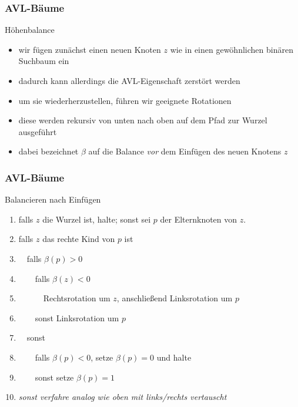 \documentclass[aspectratio=1610, 11pt]{beamer}
\newcommand{\mytitle}{AVL-B\"aume}
\begin{document}
\begin{frame}\frametitle{\mytitle}
	\begin{exampleblock}{H\"ohenbalance}
		\begin{itemize}
			\item wir f\"ugen zun\"achst einen neuen Knoten $z$ wie in einen gew\"ohnlichen bin\"aren Suchbaum ein
			\item dadurch kann allerdings die AVL-Eigenschaft zerst\"ort werden
			\item um sie wiederherzustellen, f\"uhren wir geeignete \alert{Rotationen}
			\item diese werden \alert{rekursiv} von unten nach oben auf dem Pfad zur Wurzel ausgef\"uhrt
			\item dabei bezeichnet $\beta$ auf die Balance {\em vor} dem Einf\"ugen des neuen Knotens $z$
		\end{itemize}
	\end{exampleblock}
\end{frame}

\begin{frame}\frametitle{\mytitle}
	\begin{exampleblock}{Balancieren nach Einf\"ugen}
		\begin{enumerate}
			\item falls $z$ die Wurzel ist, halte; sonst sei $p$ der Elternknoten von $z$.
			\item falls $z$ das rechte Kind von $p$ ist
			\item $\quad$falls $\beta(p)>0$
			\item $\qquad$falls $\beta(z)<0$
			\item $\quad\qquad$Rechtsrotation um $z$, anschlie\ss end Linksrotation um $p$
			\item $\qquad$sonst Linksrotation um $p$
			\item $\quad$sonst
			\item $\qquad$falls $\beta(p)<0$, setze $\beta(p)=0$ und halte
			\item $\qquad$sonst setze $\beta(p)=1$
			\item \itshape sonst verfahre analog wie oben mit links/rechts vertauscht
		\end{enumerate}
	\end{exampleblock}
\end{frame}
\end{document}
